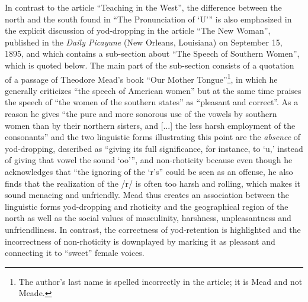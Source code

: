 In contrast to the article “Teaching in the West”, the difference between the north and the south found in “The Pronunciation of ‘U’” is also emphasized in the explicit discussion of yod-dropping in the article “The New Woman”, published in the \emph{Daily Picayune} (New Orleans, Louisiana) on September 15, 1895, and which contains a sub-section about “The Speech of Southern Women”, which is quoted below. The main part of the sub-section consists of a quotation of a passage of Theodore Mead’s book “Our Mother Tongue”\footnote{The author’s last name is spelled incorrectly in the article; it is Mead and not Meade.}, in which he generally criticizes “the speech of American women” but at the same time praises the speech of “the women of the southern states” as “pleasant and correct”. As a reason he gives “the pure and more sonorous use of the vowels by southern women than by their northern sisters, and [...] the less harsh employment of the consonants” and the two linguistic forms illustrating this point are the \emph{absence} of yod-dropping, described as “giving its full significance, for instance, to ‘u,’ instead of giving that vowel the sound ‘oo’”, and non-rhoticity because even though he acknowledges that “the ignoring of the ‘r’s” could be seen as an offense, he also finds that the realization of the /r/ is often too harsh and rolling, which makes it sound menacing and unfriendly. Mead thus creates an association between the linguistic forms yod-dropping and rhoticity and the geographical region of the north as well as the social values of masculinity, harshness, unpleasantness and unfriendliness. In contrast, the correctness of yod-retention is highlighted and the incorrectness of non-rhoticity is downplayed by marking it as pleasant and connecting it to “sweet” female voices.

